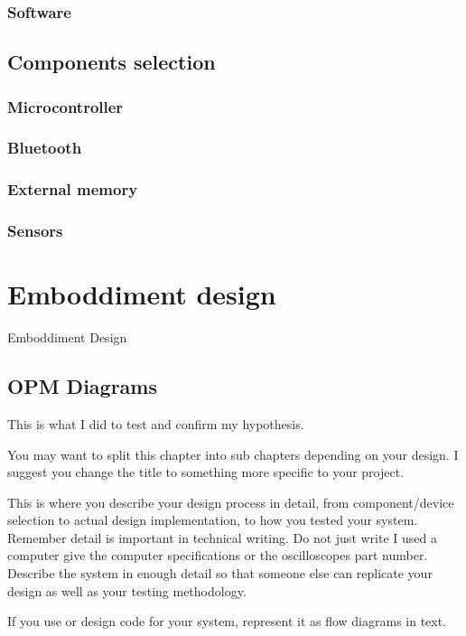 \subsubsection{Software}
\subsection{Components selection}
\subsubsection{Microcontroller}
\subsubsection{Bluetooth}
\subsubsection{External memory}
\subsubsection{Sensors}


\section{Emboddiment design}
Emboddiment Design
\subsection{OPM Diagrams}


This is what I did to test and confirm my hypothesis.


You may want to split this chapter into sub chapters depending on your design. I suggest you change
the title to something more specific to your project.

This is where you describe your design process in detail, from component/device selection to actual
design implementation, to how you tested your system. Remember detail is important in technical
writing. Do not just write I used a computer give the computer specifications or the oscilloscopes part
number. Describe the system in enough detail so that someone else can replicate your design as well
as your testing methodology.

If you use or design code for your system, represent it as flow diagrams in text.
